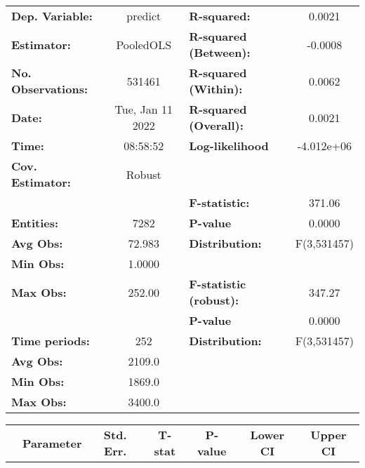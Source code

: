 \begin{center}
\begin{tabular}{lclc}
\toprule
\textbf{Dep. Variable:}    &      predict       & \textbf{  R-squared:         }   &      0.0021      \\
\textbf{Estimator:}        &     PooledOLS      & \textbf{  R-squared (Between):}  &     -0.0008      \\
\textbf{No. Observations:} &       531461       & \textbf{  R-squared (Within):}   &      0.0062      \\
\textbf{Date:}             &  Tue, Jan 11 2022  & \textbf{  R-squared (Overall):}  &      0.0021      \\
\textbf{Time:}             &      08:58:52      & \textbf{  Log-likelihood     }   &    -4.012e+06    \\
\textbf{Cov. Estimator:}   &       Robust       & \textbf{                     }   &                  \\
\textbf{}                  &                    & \textbf{  F-statistic:       }   &      371.06      \\
\textbf{Entities:}         &        7282        & \textbf{  P-value            }   &      0.0000      \\
\textbf{Avg Obs:}          &       72.983       & \textbf{  Distribution:      }   &   F(3,531457)    \\
\textbf{Min Obs:}          &       1.0000       & \textbf{                     }   &                  \\
\textbf{Max Obs:}          &       252.00       & \textbf{  F-statistic (robust):} &      347.27      \\
\textbf{}                  &                    & \textbf{  P-value            }   &      0.0000      \\
\textbf{Time periods:}     &        252         & \textbf{  Distribution:      }   &   F(3,531457)    \\
\textbf{Avg Obs:}          &       2109.0       & \textbf{                     }   &                  \\
\textbf{Min Obs:}          &       1869.0       & \textbf{                     }   &                  \\
\textbf{Max Obs:}          &       3400.0       & \textbf{                     }   &                  \\
\bottomrule
\end{tabular}
\begin{tabular}{lcccccc}
                & \textbf{Parameter} & \textbf{Std. Err.} & \textbf{T-stat} & \textbf{P-value} & \textbf{Lower CI} & \textbf{Upper CI}  \\

\end{tabular}
\end{center}
